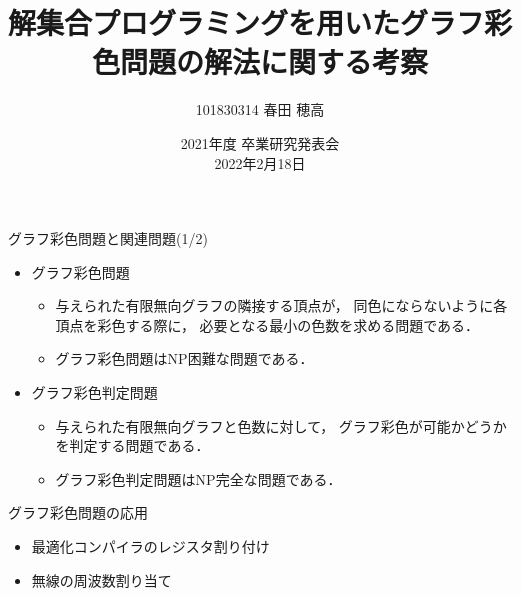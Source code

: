 \documentclass[dvipdfmx,11pt]{beamer}
\title{解集合プログラミングを用いたグラフ彩色問題の解法に関する考察}
\author{101830314 春田 穂高}
\institute{番原研究室}
\date{2021年度 卒業研究発表会\\2022年2月18日}
\begin{document}
\frame{\maketitle}

\begin{frame}{グラフ彩色問題と関連問題(1/2)}

 \begin{itemize}
  \item \alert{グラフ彩色問題}
        \begin{itemize}
         \item 与えられた有限無向グラフの隣接する頂点が，
               同色にならないように各頂点を彩色する際に，
               必要となる最小の色数を求める問題である．
         \item グラフ彩色問題はNP困難な問題である．
        \end{itemize}
  \item \alert{グラフ彩色判定問題}
        \begin{itemize}
         \item 与えられた有限無向グラフと色数に対して，
               グラフ彩色が可能かどうかを判定する問題である．
         \item グラフ彩色判定問題はNP完全な問題である．
        \end{itemize}
 \end{itemize}

 \begin{exampleblock}{グラフ彩色問題の応用}
  \begin{itemize}
   \item 最適化コンパイラのレジスタ割り付け
   \item 無線の周波数割り当て
  \end{itemize}
  
 \end{exampleblock}
 
\end{frame}

\end{document}
